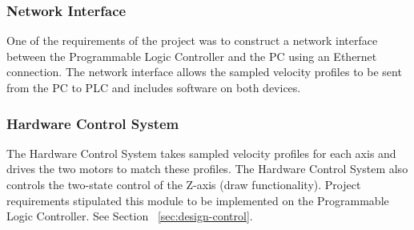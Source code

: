 	\subsubsection*{Network Interface}
		One of the requirements of the project was to construct a network interface between the Programmable Logic Controller and the PC using an Ethernet connection. The network interface allows the sampled velocity profiles to be sent from the PC to PLC and includes software on both devices. 

	\subsubsection*{Hardware Control System}
		The Hardware Control System takes sampled velocity profiles for each axis and drives the two motors to match these profiles. The Hardware Control System also controls the two-state control of the Z-axis (draw functionality). Project requirements stipulated this module to be implemented on the Programmable Logic Controller. See Section ~\ref{sec:design-control}.